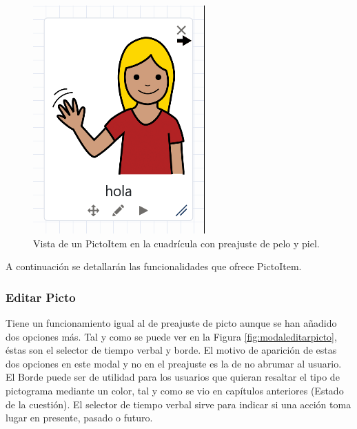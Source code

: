 \begin{figure}[h!]
	\centering
	\includegraphics[width=0.7\linewidth]{Imagenes/Bitmap/pictoItemModificado}
	\caption{Vista de un PictoItem en la cuadrícula con preajuste de pelo y piel. }
	\label{fig:pictoitemmodificado}
\end{figure}


A continuación se detallarán las funcionalidades que ofrece  PictoItem.


\subsubsection{Editar Picto}

Tiene un funcionamiento igual al de preajuste de picto aunque se han añadido dos opciones más. Tal y como se puede ver en la Figura \ref{fig:modaleditarpicto}, éstas son el selector de tiempo verbal y  borde. El motivo de aparición de estas dos opciones en este modal y no en el preajuste es la de no abrumar al usuario. El Borde puede ser de utilidad para los usuarios que quieran resaltar el tipo de pictograma mediante un color, tal y como se vio en capítulos anteriores (Estado de la cuestión). El selector de tiempo verbal sirve para indicar si una acción toma lugar en presente, pasado o futuro.

